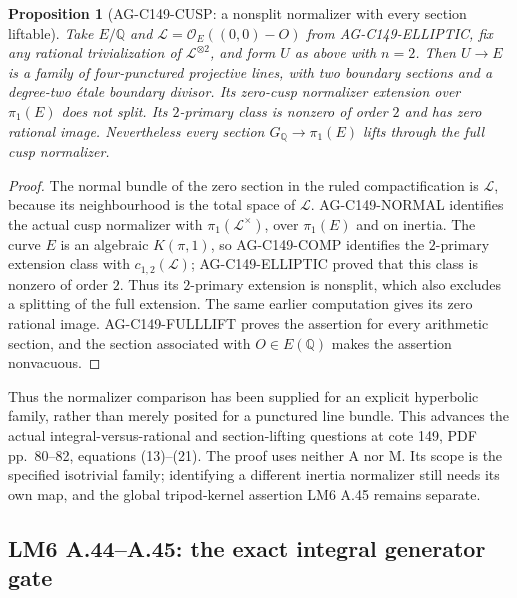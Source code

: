 \documentclass[11pt,a4paper]{article}
\newtheorem{proposition}{Proposition}
\begin{document}
\begin{proposition}[AG-C149-CUSP: a nonsplit normalizer with every section liftable]
Take $E/\mathbb Q$ and $\mathcal L=\mathcal O_E((0,0)-O)$
from AG-C149-ELLIPTIC, fix any rational trivialization of
$\mathcal L^{\otimes2}$, and form $U$ as above with $n=2$.
Then $U\to E$ is a family of four-punctured projective lines,
with two boundary sections and a degree-two \'etale boundary
divisor. Its zero-cusp normalizer extension over $\pi_1(E)$
does not split. Its $2$-primary class is nonzero of order $2$
and has zero rational image. Nevertheless every section
$G_{\mathbb Q}\to\pi_1(E)$ lifts through the full cusp normalizer.
\end{proposition}
\begin{proof}
The normal bundle of the zero section in the ruled compactification
is $\mathcal L$, because its neighbourhood is the total space of
$\mathcal L$. AG-C149-NORMAL identifies the actual cusp
normalizer with $\pi_1(\mathcal L^\times)$, over $\pi_1(E)$
and on inertia. The curve $E$ is an algebraic $K(\pi,1)$, so
AG-C149-COMP identifies the $2$-primary extension class with
$c_{1,2}(\mathcal L)$; AG-C149-ELLIPTIC proved that this class
is nonzero of order $2$. Thus its $2$-primary extension is
nonsplit, which also excludes a splitting of the full extension.
The same earlier computation gives its zero rational image.
AG-C149-FULLLIFT proves the assertion for every arithmetic
section, and the section associated with $O\in E(\mathbb Q)$
makes the assertion nonvacuous.
\end{proof}

Thus the normalizer comparison has been supplied for an explicit
hyperbolic family, rather than merely posited for a punctured line
bundle. This advances the actual integral-versus-rational and
section-lifting questions at cote 149, PDF pp.~80--82,
equations (13)--(21). The proof uses neither A nor M. Its scope is
the specified isotrivial family; identifying a different inertia
normalizer still needs its own map, and the global tripod-kernel
assertion LM6 A.45 remains separate.

\subsection{LM6 A.44--A.45: the exact integral generator gate}
\label{ag:lm6}
\end{document}
